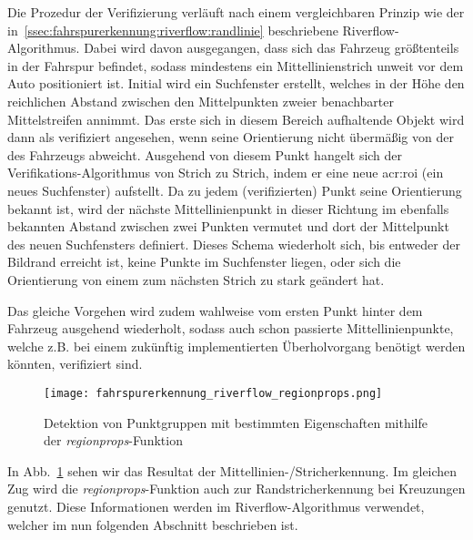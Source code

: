 Die Prozedur der Verifizierung verläuft nach einem vergleichbaren Prinzip wie der in~\ref{ssec:fahrspurerkennung:riverflow:randlinie} beschriebene Riverflow-Algorithmus. Dabei wird davon ausgegangen, dass sich das Fahrzeug größtenteils in der Fahrspur befindet, sodass mindestens ein Mittellinienstrich unweit vor dem Auto positioniert ist. Initial wird ein Suchfenster erstellt, welches in der Höhe den reichlichen Abstand zwischen den Mittelpunkten zweier benachbarter Mittelstreifen annimmt. Das erste sich in diesem Bereich aufhaltende Objekt wird dann als verifiziert angesehen, wenn seine Orientierung nicht übermäßig von der des Fahrzeugs abweicht. Ausgehend von diesem Punkt \glqq hangelt\grqq{} sich der Verifikations-Algorithmus von Strich zu Strich, indem er eine neue \gls{acr:roi} (ein neues Suchfenster) aufstellt. Da zu jedem (verifizierten) Punkt seine Orientierung bekannt ist, wird der nächste Mittellinienpunkt in dieser Richtung im ebenfalls bekannten Abstand zwischen zwei Punkten vermutet und dort der Mittelpunkt des neuen Suchfensters definiert. Dieses Schema wiederholt sich, bis entweder der Bildrand erreicht ist, keine Punkte im Suchfenster liegen, oder sich die Orientierung von einem zum nächsten Strich zu stark geändert hat.

Das gleiche Vorgehen wird zudem wahlweise vom ersten Punkt hinter dem Fahrzeug ausgehend wiederholt, sodass auch schon passierte Mittellinienpunkte, welche z.B. bei einem zukünftig implementierten Überholvorgang benötigt werden könnten, verifiziert sind.

\begin{figure}[H]
	\centering
	\texttt{[image: fahrspurerkennung\_riverflow\_regionprops.png]}
	\caption{Detektion von Punktgruppen mit bestimmten Eigenschaften mithilfe der \emph{regionprops}-Funktion}
	\label{fig:riverflow:mittellinie:regionprops}
\end{figure}

In Abb.~\ref{fig:riverflow:mittellinie:regionprops} sehen wir das Resultat der Mittellinien-/Stricherkennung. Im gleichen Zug wird die \emph{regionprops}-Funktion auch zur Randstricherkennung bei Kreuzungen genutzt. Diese Informationen werden im Riverflow-Algorithmus verwendet, welcher im nun folgenden Abschnitt beschrieben ist.